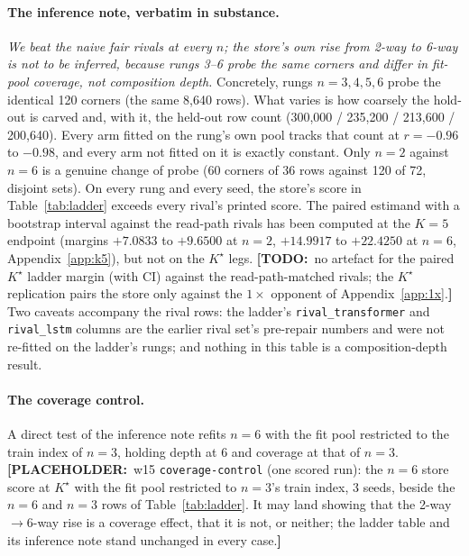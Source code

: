 \documentclass{article} %
\newcommand{\PLACEHOLDER}[1]{{\color{red}\textbf{[PLACEHOLDER:}~#1\textbf{]}}}
\newcommand{\TODO}[1]{{\color{orange}\textbf{[TODO:}~#1\textbf{]}}}
\newcommand{\Kstar}{\ensuremath{K^{\star}}}
\begin{document}
\paragraph{The inference note, verbatim in substance.} \emph{We beat the naive fair rivals at
every $n$; the store's own rise from 2-way to 6-way is not to be inferred, because rungs 3--6
probe the same corners and differ in fit-pool coverage, not composition depth.} Concretely,
rungs $n=3,4,5,6$ probe the identical 120 corners (the same 8,640 rows). What varies is how
coarsely the hold-out is carved and, with it, the held-out row count (300,000 / 235,200 /
213,600 / 200,640). Every arm fitted on the rung's own pool tracks that count at
$r=-0.96$ to $-0.98$, and every arm not fitted on it is exactly constant.
Only $n=2$ against $n=6$ is a genuine change of probe (60 corners of 36 rows against 120 of
72, disjoint sets). %
On every rung and every seed, the store's score in Table~\ref{tab:ladder} exceeds every
rival's printed score. The paired estimand with a bootstrap interval against the read-path
rivals has been computed at the $K=5$ endpoint (margins $+7.0833$ to $+9.6500$ at $n=2$,
$+14.9917$ to $+22.4250$ at $n=6$, Appendix~\ref{app:k5}), but not on the $\Kstar$ legs.
\TODO{no artefact for the paired $\Kstar$ ladder margin (with CI) against the read-path-matched
rivals; the $\Kstar$ replication pairs the store only against the $1\times$ opponent of
Appendix~\ref{app:1x}.}
Two caveats accompany the rival rows: the ladder's \texttt{rival\_transformer} and
\texttt{rival\_lstm} columns are the earlier rival set's pre-repair numbers and were not
re-fitted on the ladder's rungs; and nothing in this table is a composition-depth result.

\paragraph{The coverage control.} A direct test of the inference note refits $n=6$ with the
fit pool restricted to the train index of $n=3$, holding depth at 6 and coverage at that of $n=3$.
\PLACEHOLDER{w15 \texttt{coverage-control} (one scored run): the $n=6$ store score at $\Kstar$
with the fit pool restricted to $n=3$'s train index, 3 seeds, beside the $n=6$ and $n=3$ rows
of Table~\ref{tab:ladder}. It may land showing that the 2-way$\to$6-way rise is a coverage
effect, that it is not, or neither; the ladder table and its inference note stand unchanged in
every case.}
\end{document}

